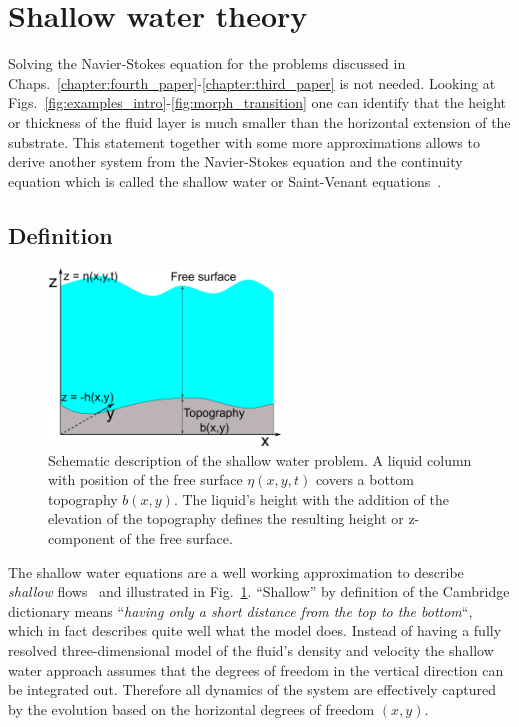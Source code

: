 \section{Shallow water theory}
\label{sec:theory_shallow_water}
Solving the Navier-Stokes equation for the problems discussed in Chaps.~\ref{chapter:fourth_paper}-\ref{chapter:third_paper} is not needed.
Looking at Figs.~\ref{fig:examples_intro}-\ref{fig:morph_transition} one can identify that the height or thickness of the fluid layer is much smaller than the horizontal extension of the substrate.
This statement together with some more approximations allows to derive another system from the Navier-Stokes equation and the continuity equation which is called the shallow water or Saint-Venant equations~\cite{bTheorieMouvementNonpermanent1871}.

\subsection{Definition}
\begin{figure}
    \centering
    \includegraphics[width=0.55\textwidth]{graphics/simple_shallow_water.pdf}
    \caption{Schematic description of the shallow water problem. A liquid column with position of the free surface $\eta(x,y,t)$ covers a bottom topography $b(x,y)$.
    The liquid's height with the addition of the elevation of the topography defines the resulting height or z-component of the free surface.}
    \label{fig:shallow_water_drawing}
\end{figure}

The shallow water equations are a well working approximation to describe \textit{shallow} flows~\cite{tanShallowWaterHydrodynamics1992} and illustrated in Fig.~\ref{fig:shallow_water_drawing}.
``Shallow'' by definition of the Cambridge dictionary means ``\textit{having only a short distance from the top to the bottom}``, which in fact describes quite well what the model does.
Instead of having a fully resolved three-dimensional model of the fluid's density and velocity the shallow water approach assumes that the degrees of freedom in the vertical direction can be integrated out. 
Therefore all dynamics of the system are effectively captured by the evolution based on the horizontal degrees of freedom $(x,y)$.

